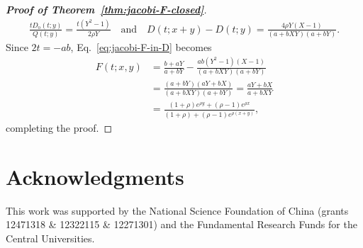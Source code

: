 \documentclass[12pt]{article}
\numberwithin{equation}{section}
\theoremstyle{plain}
\begin{document}
\begin{proof}[{\bf Proof of Theorem~\ref{thm:jacobi-F-closed}}]
\begin{align*}
   				\frac{tD_{\mathrm o}(t;y)}{Q(t;y)}
   				=\frac{t(Y^2-1)}{2\rho Y}
   				\quad\text{and}\quad D(t;x+y)-D(t;y)
   				=\frac{4\rho Y(X-1)}{(a+bXY)(a+bY)}.
   			\end{align*}
   			Since $2t=-ab$, Eq.~\eqref{eq:jacobi-F-in-D} becomes
   			\begin{align*}
   				F(t;x,y)
   				&=\frac{b+aY}{a+bY}
   				-\frac{ab(Y^2-1)(X-1)}{(a+bXY)(a+bY)}\\
   				&=\frac{(a+bY)(aY+bX)}{(a+bXY)(a+bY)}
   				=\frac{aY+bX}{a+bXY}\\
   				&=\frac{(1+\rho)e^{\rho y}+(\rho-1)e^{\rho x}}
   				{(1+\rho)+(\rho-1)e^{\rho(x+y)}},
   			\end{align*}
   			 completing the proof. 
			\end{proof}
   			
   			    \section*{Acknowledgments}
   This work was supported by the National  Science Foundation of China  (grants 12471318  \&  12322115 \& 12271301)
   and the Fundamental Research Funds for the Central Universities.  
  
  
  
  
 
	
	
\end{document}
